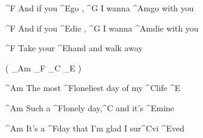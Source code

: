 \begin{song}
\begin{verse}
\end{verse}


\begin{bridge}

	^{F} And if you ^{E}go , ^{G} I wanna ^{Am}go  with you 
	
	^{F} And if you ^{E}die , ^{G} I wanna ^{Am}die  with you 
	
	^{F} Take your ^{E}hand  and walk away 
	

	 ( _{Am}  _{F}  _{C}  _{E}  )                        
	
	
	^{Am} The most ^{F}loneliest  day of my ^{C}life   ^{E}        
	
	
	^{Am} Such a ^{F}lonely  day,^{C}  and it's ^{E}mine  
	
	^{Am} It's a ^{F}day  that I'm glad I sur^{C}vi ^{E}ved  
\end{bridge}
	


		
\end{song}